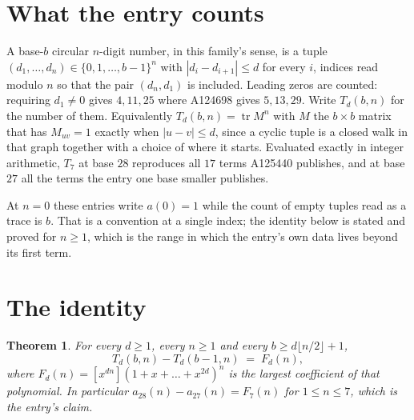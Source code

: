 \documentclass[11pt,a4paper]{article}
\theoremstyle{plain}
\newtheorem{theorem}{Theorem}
\theoremstyle{definition}
\begin{document}
\section{What the entry counts}

A base-$b$ circular $n$-digit number, in this family's sense, is a tuple
$(d_1,\dots,d_n)\in\{0,1,\dots,b-1\}^{n}$ with $|d_i-d_{i+1}|\le d$ for every $i$, indices
read modulo $n$ so that the pair $(d_n,d_1)$ is included. Leading zeros are counted: requiring
$d_1\ne0$ gives $4,11,25$ where A124698 gives $5,13,29$. Write $T_d(b,n)$ for the number of
them. Equivalently $T_d(b,n)=\operatorname{tr}M^{n}$ with $M$ the $b\times b$ matrix that has
$M_{uv}=1$ exactly when $|u-v|\le d$, since a cyclic tuple is a closed walk in that graph
together with a choice of where it starts. Evaluated exactly in integer arithmetic, $T_{7}$
at base $28$ reproduces all $17$ terms A125440 publishes, and at base $27$ all the
terms the entry one base smaller publishes.

At $n=0$ these entries write $a(0)=1$ while the count of empty tuples read as a trace is $b$.
That is a convention at a single index; the identity below is stated and proved for $n\ge1$,
which is the range in which the entry's own data lives beyond its first term.

\section{The identity}

\begin{theorem}
For every $d\ge1$, every $n\ge1$ and every $b\ge d\lfloor n/2\rfloor+1$,
\[
T_d(b,n)-T_d(b-1,n)\;=\;F_d(n),
\]
where $F_d(n)=[x^{dn}](1+x+\dots+x^{2d})^{n}$ is the largest coefficient of that
polynomial. In particular $a_{28}(n)-a_{27}(n)=F_{7}(n)$ for $1\le n\le7$, which
is the entry's claim.
\end{theorem}
\end{document}
